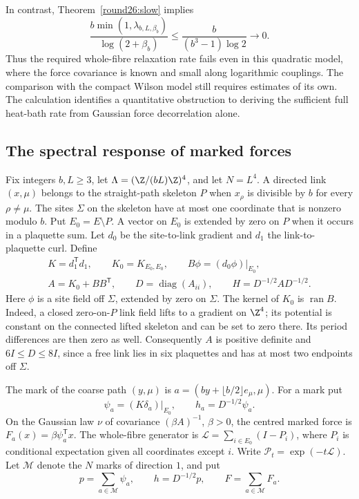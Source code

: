 In contrast, Theorem~\ref{round26:slow} implies
\[
 \frac{b\min(1,\lambda_{b,L,\beta_b})}{\log(2+\beta_b)}
 \le\frac{b}{(b^3-1)\log2}\longrightarrow0.
\]
Thus the required whole-fibre relaxation rate fails even in this quadratic
model, where the force covariance is known and small along logarithmic
couplings. The comparison with the compact Wilson model still requires
estimates of its own. The calculation identifies a quantitative
obstruction to deriving the sufficient full heat-bath rate from Gaussian
force decorrelation alone.

\subsection{The spectral response of marked forces}


Fix integers $b,L\ge3$, let $\Lambda=(\Z/(bL)\Z)^4$, and let
$N=L^4$. A directed link $(x,\mu)$ belongs to the straight-path skeleton
$P$ when $x_\rho$ is divisible by $b$ for every $\rho\ne\mu$.
The sites $\Sigma$ on the skeleton have at most one coordinate that is
nonzero modulo $b$. Put $E_0=E\setminus P$. A vector on $E_0$ is
extended by zero on $P$ when it occurs in a plaquette sum.
Let $d_0$ be the site-to-link gradient and $d_1$ the link-to-plaquette
curl. Define
\[
 \begin{gathered}
 K=d_1^{\mathsf T}d_1,\qquad K_0=K_{E_0,E_0},\qquad
 B\phi=(d_0\phi)|_{E_0},\\
 A=K_0+BB^{\mathsf T},\qquad
 D=\operatorname{diag}(A_{ii}),\qquad H=D^{-1/2}AD^{-1/2}.
 \end{gathered}
\]
Here $\phi$ is a site field off $\Sigma$, extended by zero on $\Sigma$.
The kernel of $K_0$ is $\operatorname{ran}B$. Indeed, a closed zero-on-$P$
link field lifts to a gradient on $\Z^4$; its potential is constant on the
connected lifted skeleton and can be set to zero there. Its period
differences are then zero as well. Consequently $A$ is positive definite
and $6I\le D\le8I$, since a free link lies in six plaquettes and has at
most two endpoints off $\Sigma$.

The mark of the coarse path $(y,\mu)$ is
$a=(by+\lfloor b/2\rfloor e_\mu,\mu)$. For a mark put
\[
 \psi_a=(K\delta_a)|_{E_0},\qquad h_a=D^{-1/2}\psi_a.
\]
On the Gaussian law $\nu$ of covariance $(\beta A)^{-1}$, $\beta>0$, the
centred marked force is $F_a(x)=\beta\psi_a^{\mathsf T}x$.
The whole-fibre generator is $\mathscr L=\sum_{i\in E_0}(I-P_i)$,
where $P_i$ is conditional expectation given all coordinates except $i$.
Write $\mathscr P_t=\exp(-t\mathscr L)$.
Let $\mathcal M$ denote the $N$ marks of direction $1$, and put
\[
 p=\sum_{a\in\mathcal M}\psi_a,\qquad h=D^{-1/2}p,
 \qquad F=\sum_{a\in\mathcal M}F_a.
\]

